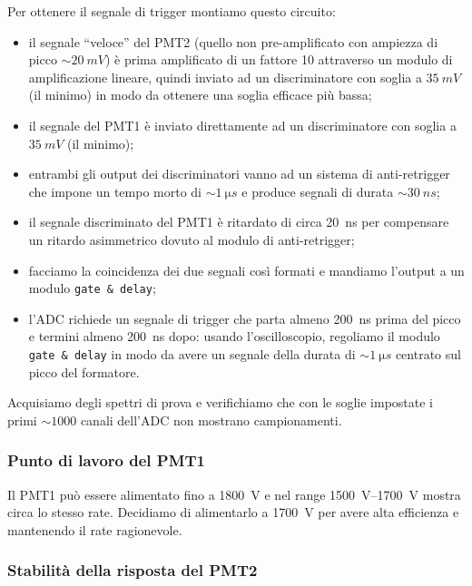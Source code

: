 Per ottenere il segnale di trigger montiamo questo circuito:
\begin{itemize}
	\item il segnale ``veloce'' del PMT2 (quello non pre-amplificato con ampiezza di picco $\sim\SI{20}{mV}$) è prima amplificato di un fattore 10 attraverso un modulo di amplificazione lineare, quindi inviato ad un discriminatore con soglia a $\SI{35}{mV}$ (il minimo) in modo da ottenere una soglia efficace più bassa;
	\item il segnale del PMT1 è inviato direttamente ad un discriminatore con soglia a $\SI{35}{mV}$ (il minimo);
	\item entrambi gli output dei discriminatori vanno ad un sistema di anti-retrigger che impone un tempo morto di $\sim\SI{1}{\micro s}$ e produce segnali di durata $\sim\SI{30}{ns}$;
	\item il segnale discriminato del PMT1 è ritardato di circa \SI{20}{ns} per compensare un ritardo asimmetrico dovuto al modulo di anti-retrigger;
	\item facciamo la coincidenza dei due segnali così formati e mandiamo l'output a un modulo \texttt{gate \& delay};
	\item l'ADC richiede un segnale di trigger che parta almeno \SI{200}{ns} prima del picco e termini almeno \SI{200}{ns} dopo: usando l'oscilloscopio, regoliamo il modulo \texttt{gate \& delay} in modo da avere un segnale della durata di $\sim\SI{1}{\micro s}$ centrato sul picco del formatore.
\end{itemize}
Acquisiamo degli spettri di prova e verifichiamo che con le soglie impostate i primi $\sim1000$ canali dell'ADC non mostrano campionamenti.

\subsubsection{Punto di lavoro del PMT1}

Il PMT1 può essere alimentato fino a \SI{1800}{V} e nel range \SI{1500}{V}--\SI{1700}{V} mostra circa lo stesso rate. Decidiamo di alimentarlo a \SI{1700}{V} per avere alta efficienza e mantenendo il rate ragionevole.

\subsubsection{Stabilità della risposta del PMT2}

